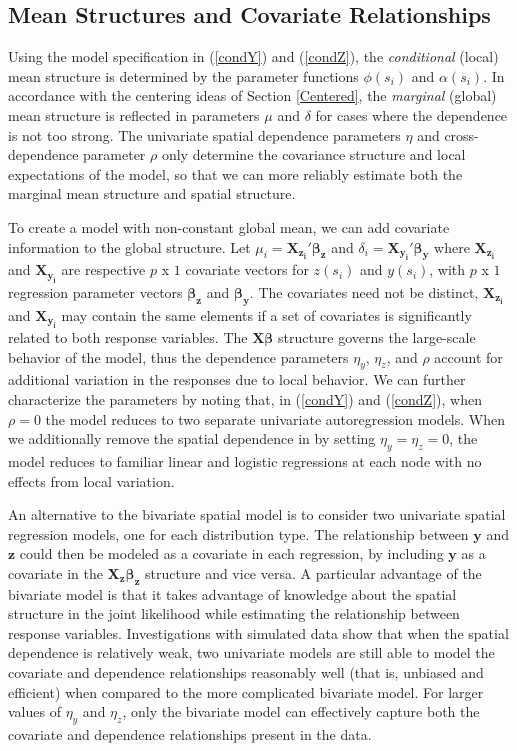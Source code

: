 \documentclass[12pt, a4paper, twoside]{article}
\begin{document}
\subsection{Mean Structures and Covariate Relationships} \label{ModelProp}
Using the model specification in (\ref{condY}) and (\ref{condZ}), the \textit{conditional} (local) mean structure is determined by the parameter functions $\phi(s_i)$ and $\alpha(s_i)$. In accordance with the centering ideas of Section \ref{Centered}, the \textit{marginal} (global) mean structure is reflected in parameters $\mu$ and $\delta$ for cases where the dependence is not too strong. The univariate spatial dependence parameters $\eta$ and cross-dependence parameter $\rho$ only determine the covariance structure and local expectations of the model, so that we can more reliably estimate both the marginal mean structure and spatial structure.

To create a model with non-constant global mean, we can add covariate information to the global structure. Let $\mu_i = \boldsymbol{X_{z_i}'\beta_z}$ and $\delta_i = \boldsymbol{X_{y_i}'\beta_y}$ where $\boldsymbol{X_{z_i}}$ and $\boldsymbol{X_{y_i}}$ are respective $p$ x $1$ covariate vectors for $z(s_i)$ and $y(s_i)$,  with $p$ x $1$ regression parameter vectors $\boldsymbol{\beta_z}$ and $\boldsymbol{\beta_y}$. The covariates need not be distinct, $\boldsymbol{X_{z_i}}$ and $\boldsymbol{X_{y_i}}$ may contain the same elements if a set of covariates is significantly related to both response variables. The $\mathbf{X}\boldsymbol{\beta}$ structure governs the large-scale behavior of the model, thus the dependence parameters $\eta_y$, $\eta_z$, and $\rho$ account for additional variation in the responses due to local behavior. We can further characterize the parameters by noting that, in (\ref{condY}) and (\ref{condZ}), when $\rho=0$ the model reduces to two separate univariate autoregression models. When we additionally remove the spatial dependence in by setting $\eta_{y}=\eta_z=0$, the model reduces to familiar linear and logistic regressions at each node with no effects from local variation.


An alternative to the bivariate spatial model is to consider two univariate spatial regression models, one for each distribution type. The relationship between $\boldsymbol{y}$ and $\boldsymbol{z}$ could then be modeled as a covariate in each regression, by including $\boldsymbol{y}$ as a covariate in the $\mathbf{X_z}\boldsymbol{\beta_z}$ structure and vice versa. A particular advantage of the bivariate model is that it takes advantage of knowledge about the spatial structure in the joint likelihood while estimating the relationship between response variables. Investigations with simulated data show that when the spatial dependence is relatively weak, two univariate models are still able to model the covariate and dependence relationships reasonably well (that is, unbiased and efficient) when compared to the more complicated bivariate model. For larger values of $\eta_y$ and $\eta_z$, only the bivariate model can effectively capture both the covariate and dependence relationships present in the data.
\end{document}
